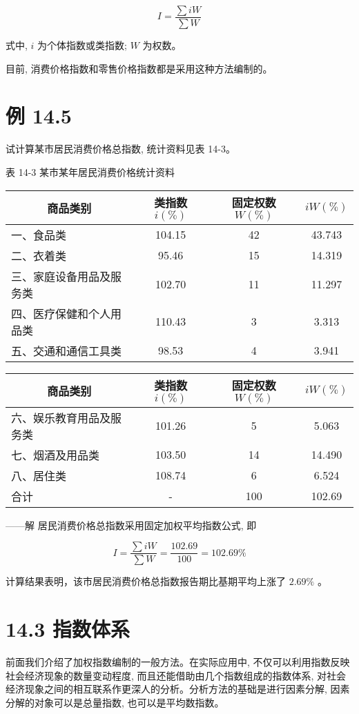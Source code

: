 \documentclass[10pt]{article}
\begin{document}
\begin{CJK*}{UTF8}{bsmi}
\begin{equation*}
I=\frac{\sum i W}{\sum W} \tag{14.13}
\end{equation*}


式中, $i$ 为个体指数或类指数; $W$ 为权数。

目前, 消费价格指数和零售价格指数都是采用这种方法编制的。

\section*{例 14.5}
试计算某市居民消费价格总指数, 统计资料见表 14-3。

表 14-3 某市某年居民消费价格统计资料

\begin{center}
\begin{tabular}{lccc}
\hline
\multicolumn{1}{c}{商品类别} & 类指数 $i(\%)$ & 固定权数 $W(\%)$ & $i W(\%)$ \\
\hline
一、食品类 & 104.15 & 42 & 43.743 \\
二、衣着类 & 95.46 & 15 & 14.319 \\
三、家庭设备用品及服务类 & 102.70 & 11 & 11.297 \\
四、医疗保健和个人用品类 & 110.43 & 3 & 3.313 \\
五、交通和通信工具类 & 98.53 & 4 & 3.941 \\
\hline
\end{tabular}
\end{center}

\begin{center}
\begin{tabular}{lccc}
\hline
\multicolumn{1}{c}{商品类别} & 类指数 $i(\%)$ & 固定权数 $W(\%)$ & $i W(\%)$ \\
\hline
六、娱乐教育用品及服务类 & 101.26 & 5 & 5.063 \\
七、烟酒及用品类 & 103.50 & 14 & 14.490 \\
八、居住类 & 108.74 & 6 & 6.524 \\
\hline
合计 & - & 100 & 102.69 \\
\hline
\end{tabular}
\end{center}

——解 居民消费价格总指数采用固定加权平均指数公式, 即

$$
I=\frac{\sum i W}{\sum W}=\frac{102.69}{100}=102.69 \%
$$

计算结果表明，该市居民消费价格总指数报告期比基期平均上涨了 $2.69 \%$ 。

\section*{14.3 指数体系}
前面我们介绍了加权指数编制的一般方法。在实际应用中, 不仅可以利用指数反映社会经济现象的数量变动程度, 而且还能借助由几个指数组成的指数体系, 对社会经济现象之间的相互联系作更深人的分析。分析方法的基础是进行因素分解, 因素分解的对象可以是总量指数, 也可以是平均数指数。


\end{CJK*}
\end{document}
